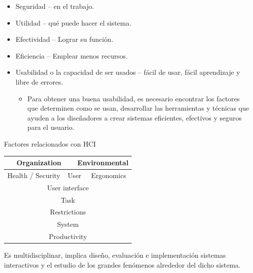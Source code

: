 \documentclass[12pt, twoside, openright]{report} %
\begin{document}
    \begin{itemize}
    
    \item
      Seguridad -- en el trabajo.
    \item
      Utilidad -- qué puede hacer el sistema.
    \item
      Efectividad -- Lograr su función.
    \item
      Eficiencia -- Emplear menos recursos.
    \item
      Usabilidad o la capacidad de ser usados -- fácil de usar, fácil
      aprendizaje y libre de errores.

      \begin{itemize}
      
      \item
        Para obtener una buena usabilidad, es necesario encontrar los
        factores que determinen como se usan, desarrollar las
        herramientas y técnicas que ayuden a los diseñadores a crear
        sistemas eficientes, efectivos y seguros para el usuario.
       
      \end{itemize}
    \end{itemize}

    Factores relacionados con HCI
	\begin{table}[h]
		\begin{tabular}{|c|c|c|c|}
		\hline
		\multicolumn{2}{|c|}{Organization}   & \multicolumn{2}{c|}{Environmental}   \\ \hline
		Health / Security        & \multicolumn{2}{c|}{User} & Ergonomics           \\ \hline
		\multicolumn{4}{|c|}{User interface}                                        \\ \hline
		\multicolumn{4}{|c|}{Task}                                                  \\ \hline
		\multicolumn{4}{|c|}{Restrictions}                                          \\ \hline
		\multicolumn{4}{|c|}{System}                                                \\ \hline
		\multicolumn{4}{|c|}{Productivity}                                          \\ \hline
		\end{tabular}
		\end{table}
   

    Es multidisciplinar, implica diseño, evaluación e implementación
    sistemas interactivos y el estudio de los grandes fenómenos
    alrededor del dicho sistema.
\end{document}
